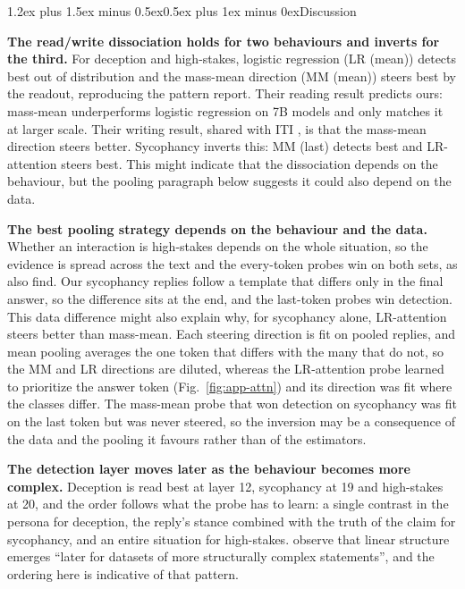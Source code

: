 \documentclass[conference]{IEEEtran}
\makeatletter
\renewcommand{\section}{\@startsection{section}{1}{\z@}%
  {1.2ex plus 1.5ex minus 0.5ex}{0.5ex plus 1ex minus 0ex}{\normalfont\normalsize\centering\scshape}}
\makeatother
\begin{document}
\section{Discussion}

\textbf{The read/write dissociation holds for two behaviours and inverts for
the third.} For deception and high-stakes, logistic regression (LR (mean)) detects best out of
distribution and the mass-mean direction (MM (mean)) steers best by the readout, reproducing the
pattern \citet{marks2024} report. Their reading result
predicts ours: mass-mean underperforms logistic regression on 7B models
and only matches it at larger scale. Their writing result, shared with ITI
\citep{li2023}, is that the mass-mean direction steers better. Sycophancy
inverts this: MM (last) detects best and LR-attention steers best. This
might indicate that the dissociation depends on the behaviour, but the
pooling paragraph below suggests it could also depend on the data.

\textbf{The best pooling strategy depends on the behaviour and the data.}
Whether an interaction is high-stakes depends on the whole situation, so
the evidence is spread across the text and the every-token probes win on
both sets, as \citet{mckenzie2025} also find. Our sycophancy replies
follow a template that differs only in the final answer, so the
difference sits at the end, and the last-token probes win detection. This data
difference might also explain why, for sycophancy alone, LR-attention
steers better than mass-mean. Each steering direction is fit on pooled
replies, and mean pooling averages the one token that differs with the
many that do not, so the MM and LR directions are
diluted, whereas the LR-attention probe learned to prioritize the answer token
(Fig.~\ref{fig:app-attn}) and its direction was fit where the classes
differ. The mass-mean probe that won detection on sycophancy was fit on the last token
but was never steered, so the inversion may be a consequence of the data
and the pooling it favours rather than of the estimators.

\textbf{The detection layer moves later as the behaviour becomes more
complex.} Deception is read best at layer 12, sycophancy at 19 and
high-stakes at 20, and the order follows what the probe has to learn: a
single contrast in the persona for deception, the reply's stance combined
with the truth of the claim for sycophancy, and an entire situation for
high-stakes. \citet[§4]{marks2024} observe that linear structure emerges
``later for datasets of more structurally complex statements'', and the
ordering here is indicative of that pattern.
\end{document}
